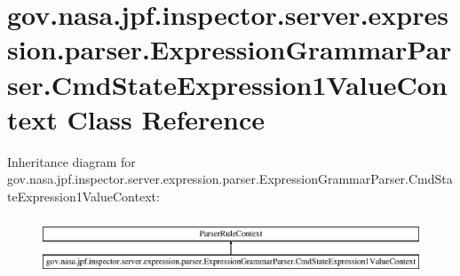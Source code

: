 \hypertarget{classgov_1_1nasa_1_1jpf_1_1inspector_1_1server_1_1expression_1_1parser_1_1_expression_grammar_paacaa2424bb30d5b61478a2ac87dd697e}{}\section{gov.\+nasa.\+jpf.\+inspector.\+server.\+expression.\+parser.\+Expression\+Grammar\+Parser.\+Cmd\+State\+Expression1\+Value\+Context Class Reference}
\label{classgov_1_1nasa_1_1jpf_1_1inspector_1_1server_1_1expression_1_1parser_1_1_expression_grammar_paacaa2424bb30d5b61478a2ac87dd697e}
Inheritance diagram for gov.\+nasa.\+jpf.\+inspector.\+server.\+expression.\+parser.\+Expression\+Grammar\+Parser.\+Cmd\+State\+Expression1\+Value\+Context\+:\begin{figure}[H]
\begin{center}
\leavevmode
\includegraphics[height=1.725732cm]{classgov_1_1nasa_1_1jpf_1_1inspector_1_1server_1_1expression_1_1parser_1_1_expression_grammar_paacaa2424bb30d5b61478a2ac87dd697e}
\end{center}
\end{figure}
